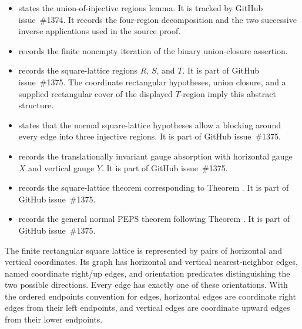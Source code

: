 \documentclass{article}
\providecommand{\ghissue}[1]{GitHub issue~\##1}
\begin{document}
\begin{itemize}
    \item {} states the union-of-injective
          regions lemma. It is tracked by \ghissue{1374}. It records the
          four-region decomposition and the two successive inverse applications
          used in the source proof.
    \item {} records the
          finite nonempty iteration of the binary union-closure assertion.
    \item {} records the square-lattice
          regions $R$, $S$, and $T$. It is part of \ghissue{1375}. The
          coordinate rectangular hypotheses, union closure, and a supplied
          rectangular cover of the displayed $T$-region imply this
          abstract structure.
    \item {} states that the
          normal square-lattice hypotheses allow a blocking around every edge into
          three injective regions. It is part of \ghissue{1375}.
    \item {} records the translationally
          invariant gauge absorption with horizontal gauge $X$ and vertical gauge
          $Y$. It is part of \ghissue{1375}.
    \item {} records the square-lattice
          theorem corresponding to Theorem . It is part of \ghissue{1375}.
    \item {} records the general normal PEPS
          theorem following Theorem . It is part of \ghissue{1375}.
\end{itemize}

The finite rectangular square lattice is represented by pairs of horizontal
and vertical coordinates. Its graph has horizontal and vertical
nearest-neighbor edges, named coordinate right/up edges, and orientation
predicates distinguishing the two possible directions. Every edge has exactly
one of these orientations. With the ordered endpoints convention for edges,
horizontal edges are coordinate right edges from their left endpoints, and
vertical edges are coordinate upward edges from their lower endpoints.
\end{document}
